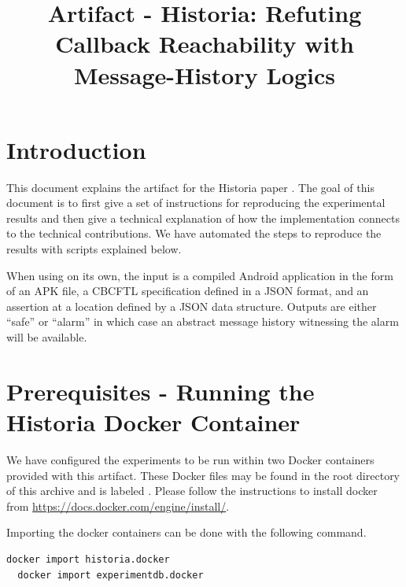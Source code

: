 \documentclass{acmart} %
\begin{document}

\newcommand{\newls}{CBCFTL\xspace}
%
\title{Artifact - Historia: Refuting Callback Reachability with Message-History Logics}

\begin{abstract}
\end{abstract}


\maketitle
%
\section{Introduction}
This document explains the artifact for the Historia paper \cite{conf/oopsla/Meier23}.
The goal of this document is to first give a set of instructions for reproducing the experimental results and then give a technical explanation of how the implementation connects to the technical contributions.
We have automated the steps to reproduce the results with scripts explained below.

When using \toolname on its own, the input is a compiled Android application in the form of an APK file, a \newls specification defined in a JSON format, and an assertion at a location defined by a JSON data structure.
Outputs are either ``safe'' or ``alarm'' in which case an abstract message history witnessing the alarm will be available.

\section{Prerequisites - Running the Historia Docker Container}

We have configured the experiments to be run within two Docker containers provided with this artifact.
These Docker files may be found in the root directory of this archive and is labeled .  Please follow the instructions to install docker from \url{https://docs.docker.com/engine/install/}.

Importing the docker containers can be done with the following command.

\begin{lstlisting}[language=bash]
  docker import historia.docker
  docker import experimentdb.docker
\end{lstlisting}
\end{document}
